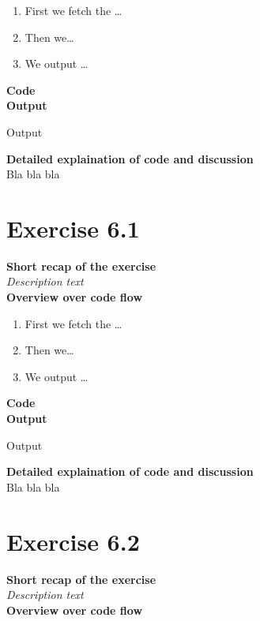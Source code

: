 \documentclass{article}
\newcommand\pythonstyle{\lstset{
language=python,
breaklines=true,
basicstyle=\ttfamily\small,
otherkeywords={1, 2, 3, 4, 5, 6, 7, 8 ,9 , 0, -, =, +, [, ], (, ), \{, \}, :, *, !},             %
keywordstyle=\color{blue},
emph={class, pass, in, for, while, if, is, elif, else, not, and, or, OR
    def, print, exec, break, continue, return},
emphstyle=\color{black}\bfseries,
emph={[2]True, False, None, self},
emphstyle=[2]\color{purple},
emph={[3]from, import, as},
emphstyle=[3]\color{blue},
stringstyle=\color{red},
frame=tb,
showstringspaces=false,
morecomment=[s]{"""}{"""},
commentstyle=\color{gray},
rulesepcolor=\color{blue},
title=\lstname
}}
\newcommand\pythonexternal[2][]{{
\pythonstyle
}}
\begin{document}
\begin{enumerate}
  \item First we fetch the \ldots
  \item Then we\ldots
  \item We output \ldots\\
\end{enumerate}

\textbf{Code}\\
\textbf{Output}
\begin{pythonOutput}
Output
\end{pythonOutput}
\textbf{Detailed explaination of code and discussion}\\
Bla bla bla


\section{Exercise 6.1}
\textbf{Short recap of the exercise}\\
\textit{Description text}\\

\textbf{Overview over code flow}\\

\begin{enumerate}
  \item First we fetch the \ldots
  \item Then we\ldots
  \item We output \ldots\\
\end{enumerate}

\textbf{Code}\\
\textbf{Output}
\begin{pythonOutput}
Output
\end{pythonOutput}
\textbf{Detailed explaination of code and discussion}\\
Bla bla bla

\section{Exercise 6.2}
\textbf{Short recap of the exercise}\\
\textit{Description text}\\

\textbf{Overview over code flow}\\
\end{document}
